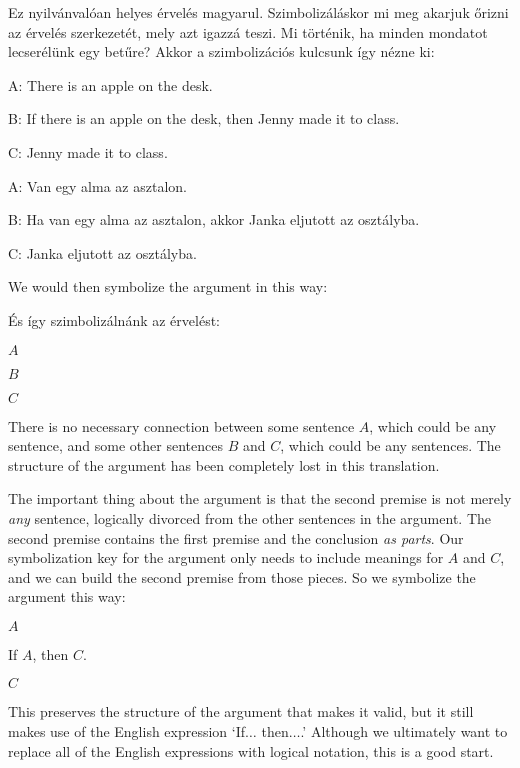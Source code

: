 Ez nyilvánvalóan helyes érvelés magyarul. Szimbolizáláskor mi meg akarjuk őrizni az érvelés szerkezetét, mely azt igazzá teszi. Mi történik, ha minden mondatot lecserélünk egy betűre? Akkor a szimbolizációs kulcsunk így nézne ki:
\begin{ekey}
\item[A:]There is an apple on the desk.
\item[B:]If there is an apple on the desk, then Jenny made it to class.
\item[C:]Jenny made it to class.
\end{ekey}
\begin{ekey}
\item[A:]Van egy alma az asztalon.
\item[B:]Ha van egy alma az asztalon, akkor Janka eljutott az osztályba.
\item[C:]Janka eljutott az osztályba.
\end{ekey}
We would then symbolize the argument in this way:

És így szimbolizálnánk az érvelést:
\begin{earg}
\item[] $A$
\item[] $B$
\item[\therefore] $C$
\end{earg}
There is no necessary connection between some sentence $A$, which could be any sentence, and some other sentences $B$ and $C$, which could be any sentences.
The structure of the argument has been completely lost in this translation.

The important thing about the argument is that the second premise is not merely \emph{any} sentence, logically divorced from the other sentences in the argument. The second premise contains the first premise and the conclusion \emph{as parts}. Our symbolization key for the argument only needs to include meanings for $A$ and $C$, and we can build the second premise from those pieces. So we symbolize the argument this way:
\begin{earg}
\item[] $A$
\item[] If $A$, then $C$.
\item[\therefore] $C$
\end{earg}
This preserves the structure of the argument that makes it valid, but it still makes use of the English expression `If$\ldots$ then$\ldots$.' Although we ultimately want to replace all of the English expressions with logical notation, this is a good start.

